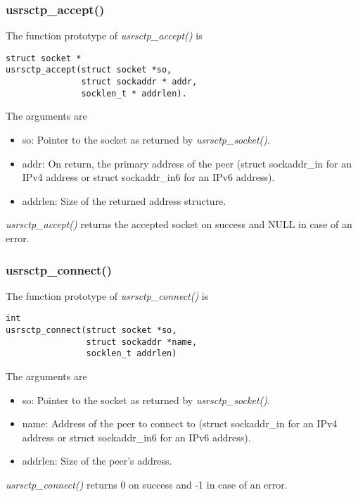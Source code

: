 \documentclass[a4paper]{article}
\begin{document}
\subsubsection{usrsctp\_accept()}
The function prototype of \textit{usrsctp\_accept()} is 
\begin{verbatim}                
struct socket *
usrsctp_accept(struct socket *so,
               struct sockaddr * addr,
               socklen_t * addrlen).
 \end{verbatim}
 The arguments are
\begin{itemize}
\item so: Pointer to the socket as returned by \textit{usrsctp\_socket()}.
\item addr: On return,  the primary address of the peer (struct sockaddr\_in for an IPv4 address or
      struct sockaddr\_in6 for an IPv6 address).
\item addrlen: Size of the returned address structure.
\end{itemize}
\textit{usrsctp\_accept()} returns the accepted socket on success and NULL in case of an error.

\subsubsection{usrsctp\_connect()}
The function prototype of \textit{usrsctp\_connect()} is 
\begin{verbatim}     
int
usrsctp_connect(struct socket *so,
                struct sockaddr *name,
                socklen_t addrlen)
 \end{verbatim}
The arguments are
\begin{itemize}
\item so: Pointer to the socket as returned by \textit{usrsctp\_socket()}.
 \item name: Address of the peer to connect to (struct sockaddr\_in for an IPv4 address or
      struct sockaddr\_in6 for an IPv6 address).
\item addrlen: Size of the peer's address.
\end{itemize}
\textit{usrsctp\_connect()} returns 0 on success and -1 in case of an error.
\end{document}
